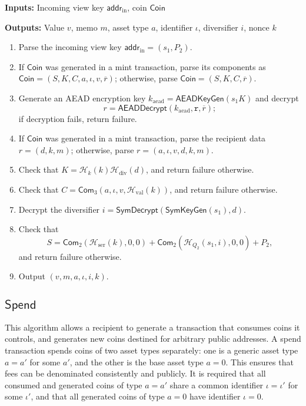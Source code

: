 \documentclass{article}
\newcommand{\func}[1]{\mathsf{#1}}
\newcommand{\addr}{\func{addr}}
\newcommand{\com}{\func{Com}}
\newcommand{\hash}{\mathcal{H}}
\begin{document}
\textbf{Inputs:} Incoming view key $\addr_{\text{in}}$, coin $\func{Coin}$

\textbf{Outputs:} Value $v$, memo $m$, asset type $a$, identifier $\iota$, diversifier $i$, nonce $k$

\begin{enumerate}
\item Parse the incoming view key $\addr_{\text{in}} = (s_1, P_2)$.
\item If $\func{Coin}$ was generated in a mint transaction, parse its components as $\func{Coin} = (S, K, C, a, \iota, v, \overline{r})$; otherwise, parse $\func{Coin} = (S, K, C, \overline{r})$.
\item Generate an AEAD encryption key $k_{\text{aead}} = \func{AEADKeyGen}(s_1 K)$ and decrypt $$r = \func{AEADDecrypt}(k_{\text{aead}},\texttt{r},\overline{r});$$ if decryption fails, return failure.
\item If $\func{Coin}$ was generated in a mint transaction, parse the recipient data $r = (d, k, m)$; otherwise, parse $r = (a, \iota, v, d, k, m)$.
\item Check that $K = \hash_k(k)\hash_{\text{div}}(d)$, and return failure otherwise.
\item Check that $C = \com_3(a,\iota,v,\hash_{\text{val}}(k))$, and return failure otherwise.
\item Decrypt the diversifier $i = \func{SymDecrypt}(\func{SymKeyGen}(s_1),d)$.
\item Check that $$S = \com_2(\hash_{\text{ser}}(k),0,0) + \com_2(\hash_{Q_2}(s_1,i),0,0) + P_2,$$ and return failure otherwise.
\item Output $(v, m, a, \iota, i, k)$.
\end{enumerate}


\subsection{\texorpdfstring{$\func{Spend}$}{Spend}}

This algorithm allows a recipient to generate a transaction that consumes coins it controls, and generates new coins destined for arbitrary public addresses.
A spend transaction spends coins of two asset types separately: one is a generic asset type $a = a'$ for some $a'$, and the other is the base asset type $a = 0$.
This ensures that fees can be denominated consistently and publicly.
It is required that all consumed and generated coins of type $a = a'$ share a common identifier $\iota = \iota'$ for some $\iota'$, and that all generated coins of type $a = 0$ have identifier $\iota = 0$.
\end{document}
